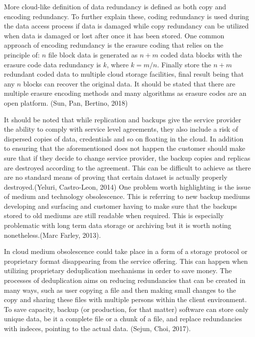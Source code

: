 \documentclass{article}
\begin{document}
\par
More cloud-like definition of data redundancy is defined as both copy and encoding redundancy. To further explain these, coding redundancy is used during the data access process if data is damaged while copy redundancy can be utilized when data is damaged or lost after once it has been stored. One common approach of encoding redundancy is the erasure coding that relies on the principle of: $n$ file block data is generated as $n + m$ coded data blocks with the erasure code data redundancy is $k$, where $k = m/n$. Finally store the $n + m$ redundant coded data to multiple cloud storage facilities, final result being that any $n$ blocks can recover the original data. It should be stated that there are multiple erasure encoding methods and many algorithms as erasure codes are an open platform. (Sun, Pan, Bertino, 2018)
\par
It should be noted that while replication and backups give the service provider the ability to comply with service level agreements, they also include a risk of dispersed copies of data, credentials and so on floating in the cloud. In addition to ensuring that the aforementioned does not happen the customer should make sure that if they decide to change service provider, the backup copies and replicas are destroyed according to the agreement. This can be difficult to achieve as there are no standard means of proving that certain dataset is actually properly destroyed.(Yeluri, Castro-Leon, 2014)
One problem worth highlighting is the issue of medium and technology obsolescence. This is referring to new backup mediums developing and surfacing and customer having to make sure that the backups stored to old mediums are still readable when required. This is especially problematic with long term data storage or archiving but it is worth noting nonetheless.(Marc Farley, 2013).
\par
In cloud medium obsolescence could take place in a form of a storage protocol or proprietary format disappearing from the service offering. This can happen when utilizing proprietary deduplication mechanisms in order to save money. The processes of deduplication aims on reducing redundancies that can be created in many ways, such as user copying a file and then making small changes to the copy and sharing these files with multiple persons within the client environment. To save capacity, backup (or production, for that matter) software can store only unique data, be it a complete file or a chunk of a file, and replace redundancies with indeces, pointing to the actual data. (Sejun, Choi, 2017).
\end{document}
